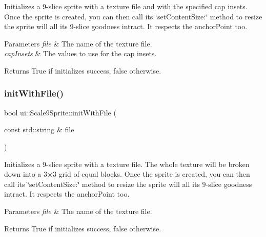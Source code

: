 Initializes a 9-\/slice sprite with a texture file and with the specified cap insets. Once the sprite is created, you can then call its \char`\"{}set\+Content\+Size\+:\char`\"{} method to resize the sprite will all it\textquotesingle{}s 9-\/slice goodness intract. It respects the anchor\+Point too.


\begin{DoxyParams}{Parameters}
{\em file} & The name of the texture file. \\
\hline
{\em cap\+Insets} & The values to use for the cap insets. \\
\hline
\end{DoxyParams}
\begin{DoxyReturn}{Returns}
True if initializes success, false otherwise. 
\end{DoxyReturn}
\mbox{\label{classui_1_1Scale9Sprite_ad3e4f907faf79e406320c10ca0785a39}} 
\subsubsection{\texorpdfstring{init\+With\+File()}{initWithFile()}\hspace{0.1cm}{\footnotesize\ttfamily [6/8]}}
{\footnotesize\ttfamily bool ui\+::\+Scale9\+Sprite\+::init\+With\+File (\begin{DoxyParamCaption}\item[{const std\+::string \&}]{file }\end{DoxyParamCaption})\hspace{0.3cm}{\ttfamily [virtual]}}

Initializes a 9-\/slice sprite with a texture file. The whole texture will be broken down into a 3×3 grid of equal blocks. Once the sprite is created, you can then call its \char`\"{}set\+Content\+Size\+:\char`\"{} method to resize the sprite will all it\textquotesingle{}s 9-\/slice goodness intract. It respects the anchor\+Point too.


\begin{DoxyParams}{Parameters}
{\em file} & The name of the texture file. \\
\hline
\end{DoxyParams}
\begin{DoxyReturn}{Returns}
True if initializes success, false otherwise. 
\end{DoxyReturn}


